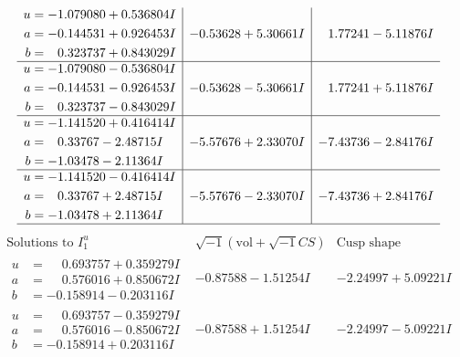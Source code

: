 \documentclass[1p]{elsarticle_modified}
\theoremstyle{definition}
\newcommand{\I}{\sqrt{-1}}
\begin{document}
$$\begin{array}{c|c|c}
\begin{aligned}
u &= -1.079080 + 0.536804 I \\
a &= -0.144531 + 0.926453 I \\
b &= \phantom{-}0.323737 + 0.843029 I\end{aligned}
 & -0.53628 + 5.30661 I & \phantom{-}1.77241 - 5.11876 I \\ \hline\begin{aligned}
u &= -1.079080 - 0.536804 I \\
a &= -0.144531 - 0.926453 I \\
b &= \phantom{-}0.323737 - 0.843029 I\end{aligned}
 & -0.53628 - 5.30661 I & \phantom{-}1.77241 + 5.11876 I \\ \hline\begin{aligned}
u &= -1.141520 + 0.416414 I \\
a &= \phantom{-}0.33767 - 2.48715 I \\
b &= -1.03478 - 2.11364 I\end{aligned}
 & -5.57676 + 2.33070 I & -7.43736 - 2.84176 I \\ \hline\begin{aligned}
u &= -1.141520 - 0.416414 I \\
a &= \phantom{-}0.33767 + 2.48715 I \\
b &= -1.03478 + 2.11364 I\end{aligned}
 & -5.57676 - 2.33070 I & -7.43736 + 2.84176 I\\
 \hline 
 \end{array}$$\newpage$$\begin{array}{c|c|c}  
\text{Solutions to }I^u_{1}& \I (\text{vol} + \sqrt{-1}CS) & \text{Cusp shape}\\
 \hline 
\begin{aligned}
u &= \phantom{-}0.693757 + 0.359279 I \\
a &= \phantom{-}0.576016 + 0.850672 I \\
b &= -0.158914 - 0.203116 I\end{aligned}
 & -0.87588 - 1.51254 I & -2.24997 + 5.09221 I \\ \hline\begin{aligned}
u &= \phantom{-}0.693757 - 0.359279 I \\
a &= \phantom{-}0.576016 - 0.850672 I \\
b &= -0.158914 + 0.203116 I\end{aligned}
 & -0.87588 + 1.51254 I & -2.24997 - 5.09221 I \\ \hline\begin{aligned}

\end{aligned}
\end{array}$$
\end{document}
